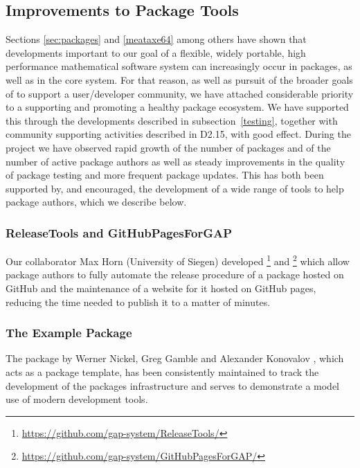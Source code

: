 \subsection{Improvements to \GAP Package Tools}\label{sec:package-tools}

Sections \ref{sec:packages} and \ref{meataxe64} among others have shown
that developments important to our goal of a flexible, widely portable, high performance
mathematical software system can increasingly occur in packages, as
well as in the core \GAP system. For that reason, as well as pursuit
of the broader goals of \ODK to support a user/developer community, we have attached
considerable priority to a supporting and promoting a healthy \GAP
package ecosystem. We have supported this through the developments
described in subsection~\ref{testing}, together with community
supporting activities described in D2.15, with
good effect. During the \ODK
project we have observed rapid growth of the number of \GAP packages
and of the number of active package
authors as well as steady improvements in the quality of package testing and more frequent
package updates. This has both been supported by, and encouraged, the
development of a wide range of tools to help package authors, which we
describe below.

\subsubsection{ReleaseTools and GitHubPagesForGAP}
Our collaborator Max Horn (University of Siegen) developed
\footnote{\url{https://github.com/gap-system/ReleaseTools/}}
and \footnote{\url{https://github.com/gap-system/GitHubPagesForGAP/}}
which allow package
authors to fully automate the release procedure of a \GAP package hosted on GitHub
and the maintenance of a website for it hosted on GitHub pages,
reducing the time needed to publish it to a matter of minutes.

\subsubsection{The Example Package}
The \GAP package  by Werner Nickel, Greg Gamble and
Alexander Konovalov \cite{example}, which acts as a package template,
has been consistently maintained to track the development of
the packages infrastructure and serves to demonstrate a model use of modern
development tools.

